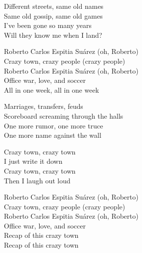 \begin{lyrics}
Different streets, same old names\\
Same old gossip, same old games\\
I’ve been gone so many years\\
Will they know me when I land?

Roberto Carlos Espitia Suárez
(oh, Roberto)\\
Crazy town, crazy people
(crazy people)\\
Roberto Carlos Espitia Suárez
(oh, Roberto)\\
Office war, love, and soccer\\
All in one week, all in one week

Marriages, transfers, feuds\\
Scoreboard screaming through the halls\\
One more rumor, one more truce\\
One more name against the wall

Crazy town, crazy town\\
I just write it down\\
Crazy town, crazy town\\
Then I laugh out loud

Roberto Carlos Espitia Suárez
(oh, Roberto)\\
Crazy town, crazy people
(crazy people)\\
Roberto Carlos Espitia Suárez
(oh, Roberto)\\
Office war, love, and soccer\\
Recap of this crazy town\\
Recap of this crazy town
\end{lyrics}

